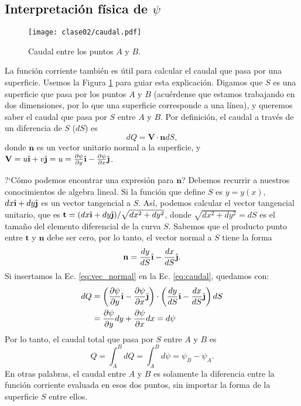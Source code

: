 \subsection*{Interpretación física de $\psi$}

\begin{figure}[!h]
\centering
\texttt{[image: clase02/caudal.pdf]}
\caption{Caudal entre los puntos $A$ y $B$.}
\label{fig:caudal}
\end{figure}

La función corriente también es útil para calcular el caudal que pasa por una superficie.
Usemos la Figura \ref{fig:caudal} para guiar esta explicación.
Digamos que $S$ es una superficie que pasa por los puntos $A$ y $B$ (acuérdense que estamos trabajando en dos dimensiones, por lo que una superficie corresponde a una línea), y queremos saber el caudal que pasa por $S$ entre $A$ y $B$.
Por definición, el caudal a través de un diferencia de $S$ ($dS$) es 
%
\begin{equation}\label{eq:caudal}
dQ = \mathbf{V}\cdot\mathbf{n}dS,
\end{equation}
%
donde $\mathbf{n}$ es un vector unitario normal a la superficie, y $\mathbf{V}=u\ihat+v\jhat=u = \frac{\partial \psi}{\partial y} \ihat -\frac{\partial \psi}{\partial x}\jhat$.

\mbox{?`}Cómo podemos encontrar una expresión para $\mathbf{n}$? Debemos recurrir a nuestros conocimientos de algebra lineal.
Si la función que define $S$ es $y=y(x)$, $dx\ihat+dy\jhat$ es un vector tangencial a $S$.
Así, podemos calcular el vector tangencial unitario, que es $\mathbf{t}=(dx\ihat+dy\jhat)/\sqrt{dx^2+dy^2}$, donde $\sqrt{dx^2+dy^2}=dS$ es el tamaño del elemento diferencial de la curva $S$.
Sabemos que el producto punto entre $\mathbf{t}$ y $\mathbf{n}$ debe ser cero, por lo tanto, el vector normal a $S$ tiene la forma
%
\begin{equation}\label{eq:vec_normal}
\mathbf{n} = \frac{dy}{dS}\ihat - \frac{dx}{dS}\jhat.
\end{equation}
%
Si insertamos la Ec. \eqref{eq:vec_normal} en la Ec. \eqref{eq:caudal}, quedamos con:
%
\begin{align}
dQ &= \left(\frac{\partial \psi}{\partial y} \ihat -\frac{\partial \psi}{\partial x}\jhat\right)\cdot\left( \frac{dy}{dS}\ihat - \frac{dx}{dS}\jhat\right)dS\nonumber\\
   &= \frac{\partial \psi}{\partial y}dy +\frac{\partial \psi}{\partial x}dx = d\psi
\end{align}
%
Por lo tanto, el caudal total que pasa por $S$ entre $A$ y $B$ es
\begin{equation}\label{eq:caudal_psi}
Q=\int_A^BdQ = \int_A^Bd\psi = \psi_B-\psi_A.
\end{equation}
%
En otras palabras, el caudal entre $A$ y $B$ es solamente la diferencia entre la función corriente evaluada en esos dos puntos, sin importar la forma de la superficie $S$ entre ellos.


